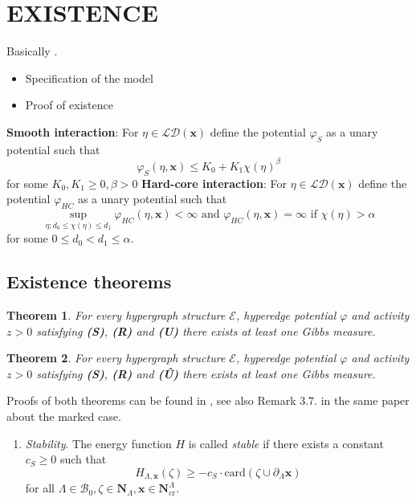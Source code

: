 \documentclass{kybernetika}
\newtheorem{theorem}{Theorem}[section]
\newcommand{\x}{{\mathbf{x}}}
\begin{document}
\section{EXISTENCE}
Basically \cite{DDG12}.

\begin{itemize}
\item Specification of the model
\item Proof of existence
\end{itemize}

\noindent \textbf{Smooth interaction}:  For $\eta\in\mathcal {LD}(\x)$ define the potential $\varphi_S$ as a unary potential such that
$$\varphi_S(\eta,\x) \leq K_0 + K_1 \chi(\eta)^{\beta}$$
for some $K_0,K_1 \geq 0, \beta >0$\newline
\textbf{Hard-core interaction}: For $\eta\in\mathcal {LD}(\x)$ define the potential $\varphi_{HC}$ as a unary potential such that
$$\sup_{\eta: d_0 \leq \chi(\eta) \leq d_1} \varphi_{HC}(\eta,\x)  < \infty \text{ and } \varphi_{HC}(\eta,\x)=\infty \text{ if } \chi(\eta)>\alpha$$ 
for some $0\leq d_0 < d_1 \leq \alpha$. 

\subsection{Existence theorems}


\begin{theorem}
	For every hypergraph structure $\mathcal E$, hyperedge potential $\varphi$ and activity $z>0$ satisfying \textbf{(S)}, \textbf{(R)} and \textbf{(U)} there exists at least one Gibbs measure.
\end{theorem}

\begin{theorem}
	For every hypergraph structure $\mathcal E$, hyperedge potential $\varphi$ and activity $z>0$ satisfying \textbf{(S)}, \textbf{(R)} and \textbf{(\^{U})} there exists at least one Gibbs measure.
\end{theorem}

Proofs of both theorems can be found in \cite{DDG12}, see also Remark 3.7. in the same paper about the marked case.




\begin{enumerate}[\textbf{(S)}] 
	\item \textit{Stability}. The energy function $H$ is called \textit{stable} if there exists a constant $c_S \geq 0$ such that 
		$$H_{\Lambda,\x}(\zeta) \geq -c_S \cdot \mathrm{card}(\zeta \cup \partial_\Lambda \x)$$
		for all $\Lambda \in \mathcal B_0, \zeta \in \mathbf N_\Lambda, \x \in \mathbf N^\Lambda_{\text{cr}}$.
\end{enumerate}
\end{document}
